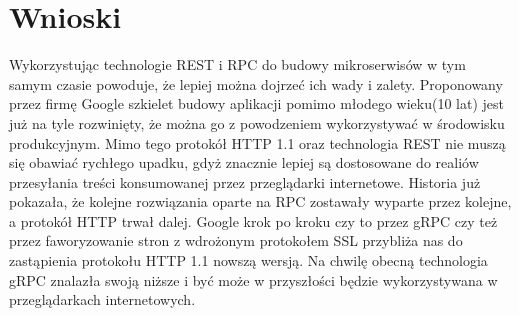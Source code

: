 \section{Wnioski}
\par Wykorzystując technologie REST i RPC do budowy mikroserwisów w tym samym czasie powoduje, że lepiej można dojrzeć ich wady i zalety. Proponowany przez firmę Google szkielet budowy aplikacji pomimo młodego wieku(10 lat) jest już na tyle rozwinięty, że można go z powodzeniem wykorzystywać w środowisku produkcyjnym. Mimo tego protokół HTTP 1.1 oraz technologia REST nie muszą się obawiać rychłego upadku, gdyż znacznie lepiej są dostosowane do realiów przesyłania treści konsumowanej przez przeglądarki internetowe. Historia już pokazała, że kolejne rozwiązania oparte na RPC zostawały wyparte przez kolejne, a protokół HTTP trwał dalej. Google krok po kroku czy to przez gRPC czy też przez faworyzowanie stron z wdrożonym protokołem SSL przybliża nas do zastąpienia protokołu HTTP 1.1 nowszą wersją. Na chwilę obecną technologia gRPC znalazła swoją niższe i być może w przyszłości będzie wykorzystywana w przeglądarkach internetowych. 
